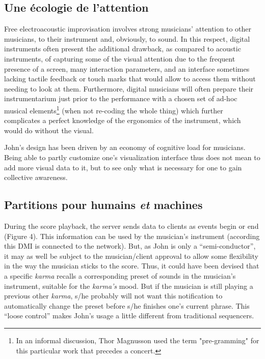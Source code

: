 \subsection{Une écologie de l'attention}

Free electroacoustic improvisation involves strong musicians' attention to other musicians, to their instrument and, obviously, to sound. In this respect, digital instruments often present the additional drawback, as compared to acoustic instruments, of capturing some of the visual attention due to the frequent presence of a screen, many interaction parameters, and an interface sometimes lacking tactile feedback or touch marks that would allow to access them without needing to look at them. Furthermore, digital musicians will often prepare their instrumentarium just prior to the performance with a chosen set of ad-hoc musical elements\footnote{In an informal discussion, Thor Magnusson used the term "pre-gramming" for this particular work that precedes a concert.} (when not re-coding the whole thing) which further complicates a perfect knowledge of the ergonomics of the instrument, which would do without the visual.

John's design has been driven by an economy of cognitive load for musicians. Being able to partly customize one's visualization interface thus does not mean to add more visual data to it, but to see only what is necessary for one to gain collective awareness.

\subsection{Partitions pour humains \emph{et} machines}
\label{sec:notation:score_for_humans_and_machines}

During the score playback, the server sends data to clients as events begin or end (Figure 4). This information can be used by the musician's instrument (according this \gls{DMI} is connected to the network). But, as John is only a “semi-conductor”, it may as well be subject to the musician/client approval to allow some flexibility in the way the musician sticks to the score. Thus, it could have been devised that a specific \textit{karma} recalls a corresponding preset of sounds in the musician's instrument, suitable for the \textit{karma's} mood. But if the musician is still playing a previous other \textit{karma}, s/he probably will not want this notification to automatically change the preset before s/he finishes one's current phrase. This “loose control” makes John's usage a little different from traditional sequencers.

